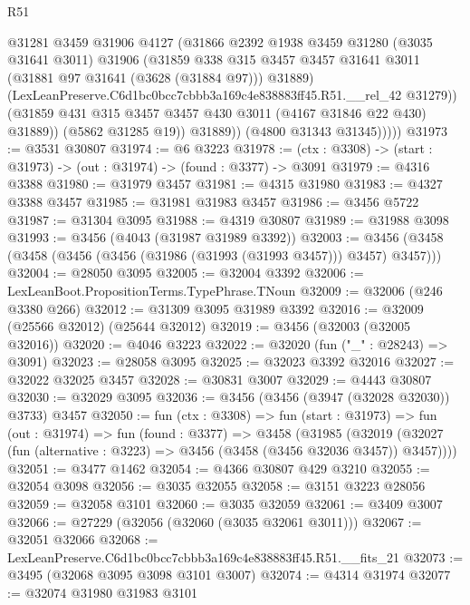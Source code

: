 \begin{lexlean}{R51}
\begin{coremodule}
                    @31281
                    @3459
                    @31906
                    @4127
                    (@31866
                      @2392
                      @1938
                      @3459
                      @31280
                      (@3035 @31641 @3011)
                      @31906
                      (@31859
                        @338
                        @315
                        @3457
                        @3457
                        @31641
                        @3011
                        (@31881 @97 @31641 (@3628 (@31884 @97)))
                        @31889)
                      (LexLeanPreserve.C6d1bc0bcc7cbbb3a169c4e838883ff45.R51.__rel_42 @31279))
                    (@31859 @431 @315 @3457 @3457 @430 @3011 (@4167 @31846 @22 @430) @31889))
                  (@5862 @31285 @19))
                @31889))
            (@4800 @31343 @31345)))))
@31973 := @3531 @30807
@31974 := @6 @3223
@31978 := (ctx : @3308) -> (start : @31973) -> (out : @31974) -> (found : @3377) -> @3091
@31979 := @4316 @3388
@31980 := @31979 @3457
@31981 := @4315 @31980
@31983 := @4327 @3388 @3457
@31985 := @31981 @31983 @3457
@31986 := @3456 @5722
@31987 := @31304 @3095
@31988 := @4319 @30807
@31989 := @31988 @3098
@31993 := @3456 (@4043 (@31987 @31989 @3392))
@32003 := @3456 (@3458 (@3458 (@3456 (@3456 (@31986 (@31993 (@31993 @3457))) @3457) @3457)))
@32004 := @28050 @3095
@32005 := @32004 @3392
@32006 := LexLeanBoot.PropositionTerms.TypePhrase.TNoun
@32009 := @32006 (@246 @3380 @266)
@32012 := @31309 @3095 @31989 @3392
@32016 := @32009 (@25566 @32012) (@25644 @32012)
@32019 := @3456 (@32003 (@32005 @32016))
@32020 := @4046 @3223
@32022 := @32020 (fun ("_" : @28243) => @3091)
@32023 := @28058 @3095
@32025 := @32023 @3392 @32016
@32027 := @32022 @32025 @3457
@32028 := @30831 @3007
@32029 := @4443 @30807
@32030 := @32029 @3095
@32036 := @3456 (@3456 (@3947 (@32028 @32030)) @3733) @3457
@32050 := fun (ctx : @3308) =>
  fun (start : @31973) =>
  fun (out : @31974) =>
  fun (found : @3377) =>
  @3458
    (@31985
      (@32019 (@32027 (fun (alternative : @3223) => @3456 (@3458 (@3456 @32036 @3457)) @3457))))
@32051 := @3477 @1462
@32054 := @4366 @30807 @429 @3210
@32055 := @32054 @3098
@32056 := @3035 @32055
@32058 := @3151 @3223 @28056
@32059 := @32058 @3101
@32060 := @3035 @32059
@32061 := @3409 @3007
@32066 := @27229 (@32056 (@32060 (@3035 @32061 @3011)))
@32067 := @32051 @32066
@32068 := LexLeanPreserve.C6d1bc0bcc7cbbb3a169c4e838883ff45.R51.__fits_21
@32073 := @3495 (@32068 @3095 @3098 @3101 @3007)
@32074 := @4314 @31974
@32077 := @32074 @31980 @31983 @3101

\end{coremodule}
\end{lexlean}
